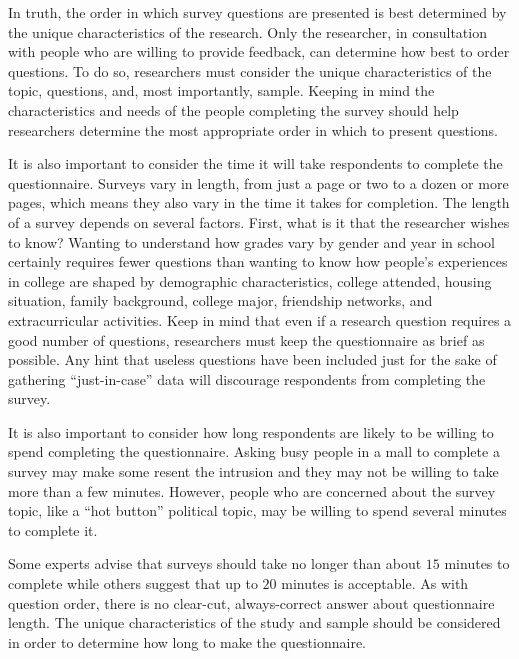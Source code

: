 In truth, the order in which survey questions are presented is best determined by the unique characteristics of the research. Only the researcher, in consultation with people who are willing to provide feedback, can determine how best to order questions. To do so, researchers must consider the unique characteristics of the topic, questions, and, most importantly, sample. Keeping in mind the characteristics and needs of the people completing the survey should help researchers determine the most appropriate order in which to present questions.

It is also important to consider the time it will take respondents to complete the questionnaire. Surveys vary in length, from just a page or two to a dozen or more pages, which means they also vary in the time it takes for completion. The length of a survey depends on several factors. First, what is it that the researcher wishes to know? Wanting to understand how grades vary by gender and year in school certainly requires fewer questions than wanting to know how people's experiences in college are shaped by demographic characteristics, college attended, housing situation, family background, college major, friendship networks, and extracurricular activities. Keep in mind that even if a research question requires a good number of questions, researchers must keep the questionnaire as brief as possible. Any hint that useless questions have been included just for the sake of gathering ``just-in-case'' data will discourage respondents from completing the survey.

It is also important to consider how long respondents are likely to be willing to spend completing the questionnaire. Asking busy people in a mall to complete a survey may make some resent the intrusion and they may not be willing to take more than a few minutes. However, people who are concerned about the survey topic, like a ``hot button'' political topic, may be willing to spend several minutes to complete it.

Some experts advise that surveys should take no longer than about $ 15 $ minutes to complete while others suggest that up to $ 20 $ minutes is acceptable. As with question order, there is no clear-cut, always-correct answer about questionnaire length. The unique characteristics of the study and sample should be considered in order to determine how long to make the questionnaire.

